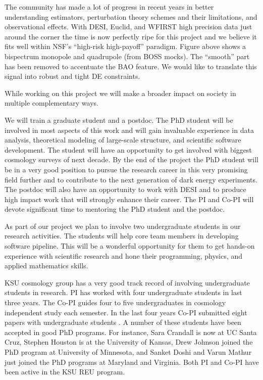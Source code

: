 The community has made a lot of progress in recent years in better
understanding estimators, perturbation theory schemes and their limitations,
and observational effects. With DESI, Euclid, and WFIRST high precision data
just around the corner the time is now perfectly ripe for this project and we
believe it fits well within NSF's ``high-risk high-payoff'' paradigm. Figure
above shows a bispectrum monopole and quadrupole (from BOSS mocks). The
``smooth'' part has been removed to accentuate the BAO feature. We would like
to translate this signal into robust and tight DE constraints.


While working on this project we will make a broader impact on society in
multiple complementary ways.

We will train a graduate student and a postdoc. The PhD student will be
involved in most aspects of this work and will gain invaluable experience in
data analysis, theoretical modeling of large-scale structure, and scientific
software development. The student will have an opportunity to get involved with
biggest cosmology surveys of next decade. By the end of the project the PhD
student will be in a very good position to pursue the research career in this
very promising field further and to contribute to the next generation of dark
energy experiments. The postdoc will also have an opportunity to work with DESI
and to produce high impact work that will strongly enhance their career. The
PI and Co-PI will devote significant time to mentoring the PhD student and
the postdoc.

As part of our project we plan to involve two undergraduate students in our
research activities. The students will help core team members in developing
software pipeline. This will be a wonderful opportunity for them to get
hands-on experience with scientific research and hone their programming,
physics, and applied mathematics skills. 

KSU cosmology group has a very good track record of involving undergraduate
students in research. PI has worked with four undergraduate students in last
three years. The Co-PI guides four to five undergraduates in cosmology
independent study each semester. In the last four years Co-PI submitted eight
papers with undergraduate students \cite{2015MPLA...3050123C,2016ApJ...829...61C,2017ApJ...835...26F,2017ApJ...835...86C,2018arXiv180205571O,2018PASP..130b4101C,2018arXiv180501917C,2018MNRAS.479.4566M,2018PASP..130k4001P}. A number of these students have been
accepted in good PhD programs. For instance, Sara Crandall is now at UC Santa
Cruz, Stephen Houston is at the University of Kansas, Drew Johnson joined the
PhD program at University of Minnesota, and Sanket Doshi and Varun Mathur just
joined the PhD programs at Maryland and Virginia. Both PI and Co-PI have been
active in the KSU REU program.

